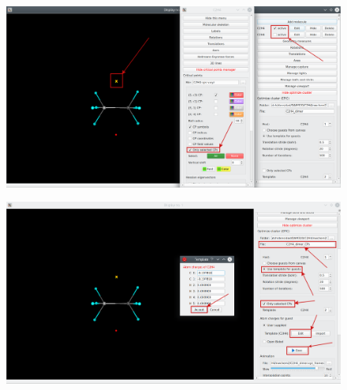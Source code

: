 \documentclass[a4paper,10pt]{article}
\begin{document}
\begin{minipage}{.5\linewidth}
\begin{figure}[H]
\caption{\label{fig:59}}
\begin{center}
\includegraphics[width=0.95\linewidth]{damqt_QS_fig59_b.png}
\end{center}
\end{figure} 
\end{minipage}
\begin{minipage}{.5\linewidth}
\begin{figure}[H]
\caption{\label{fig:60}}
\begin{center}
\includegraphics[width=0.95\linewidth]{damqt_QS_fig60_b.png}
\end{center}
\end{figure} 
\end{minipage}
\end{document}
